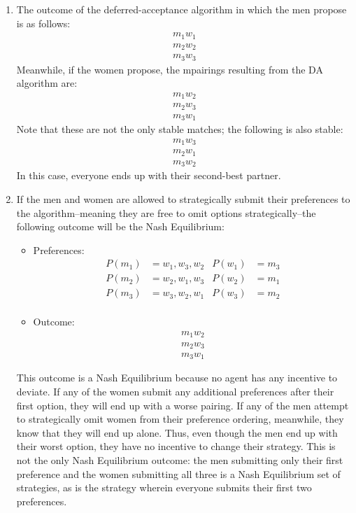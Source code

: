\documentclass[11pt]{article}
\begin{document}
\begin{enumerate}
	\begin{enumerate}
		\item The outcome of the deferred-acceptance algorithm in which the men propose is as follows:
		\begin{gather*}
			m_1 w_1 \\
			m_2 w_2 \\
			m_3 w_3
		\end{gather*}
		Meanwhile, if the women propose, the mpairings resulting from the DA algorithm are:
		\begin{gather*}
			m_1 w_2 \\
			m_2 w_3 \\
			m_3 w_1
		\end{gather*}
		Note that these are not the only stable matches; the following is also stable:
		\begin{gather*}
			m_1 w_3 \\
			m_2 w_1 \\
			m_3 w_2
		\end{gather*}
		In this case, everyone ends up with their second-best partner. 
	
		\item If the men and women are allowed to strategically submit their preferences to the algorithm--meaning they are free to omit options strategically--the following outcome will be the Nash Equilibrium:
		\begin{itemize}
			\item Preferences:
			\begin{align*}
				P(m_1) &= w_1, w_3, w_2 & P(w_1) &= m_3 \\
				P(m_2) &= w_2, w_1, w_3 & P(w_2) &= m_1 \\
				P(m_3) &= w_3, w_2, w_1 & P(w_3) &= m_2 \\
			\end{align*}
			\item Outcome:
			\begin{gather*}
				m_1 w_2 \\
				m_2 w_3 \\
				m_3 w_1
			\end{gather*}
		\end{itemize}
		This outcome is a Nash Equilibrium because no agent has any incentive to deviate. If any of the women submit any additional preferences after their first option, they will end up with a worse pairing. If any of the men attempt to strategically omit women from their preference ordering, meanwhile, they know that they will end up alone. Thus, even though the men end up with their worst option, they have no incentive to change their strategy. This is not the only Nash Equilibrium outcome: the men submitting only their first preference and the women submitting all three is a Nash Equilibrium set of strategies, as is the strategy wherein everyone submits their first two preferences. 
	\end{enumerate}


\end{enumerate}
\end{document}
